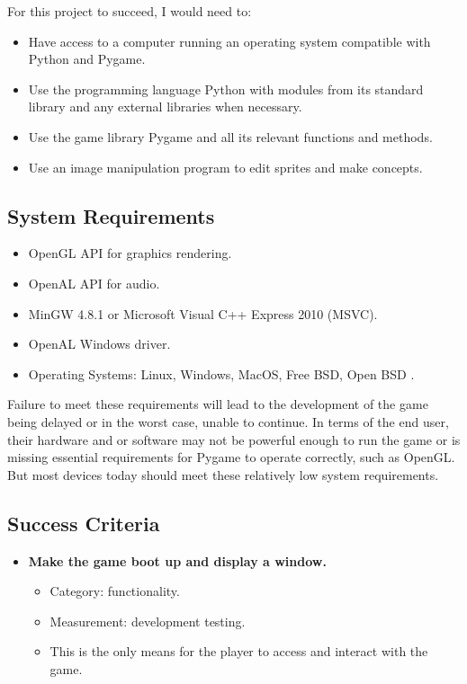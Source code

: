\documentclass[letterpaper, 11pt]{article}
\begin{document}
For this project to succeed, I would need to:

\begin{itemize}
\item Have access to a computer running an operating system compatible with Python and Pygame.
\item Use the programming language Python with modules from its standard library and any external libraries when necessary.
\item Use the game library Pygame and all its relevant functions and methods.
\item Use an image manipulation program to edit sprites and make concepts.
\end{itemize}

\subsection{System Requirements}
\label{sec:orgc018c4d}
\begin{itemize}
\item OpenGL API for graphics rendering.
\item OpenAL API for audio.
\item MinGW 4.8.1 or Microsoft Visual C++ Express 2010 (MSVC).
\item OpenAL Windows driver.
\item Operating Systems: Linux, Windows, MacOS, Free BSD, Open BSD \autocite{pygameAbout} \autocite{SDLIntro}.
\end{itemize}

Failure to meet these requirements will lead to the development of the game being delayed or in the worst case, unable to continue.
In terms of the end user, their hardware and or software may not be powerful enough to run the game or is missing essential requirements for Pygame to operate correctly, such as OpenGL.
But most devices today should meet these relatively low system requirements.

\subsection{Success Criteria}
\label{sec:orgd5a32bd}
\begin{itemize}
\item \textbf{Make the game boot up and display a window.}
\begin{itemize}
\item Category: functionality.
\item Measurement: development testing.
\item This is the only means for the player to access and interact with the game.
\end{itemize}
\end{itemize}
\end{document}
